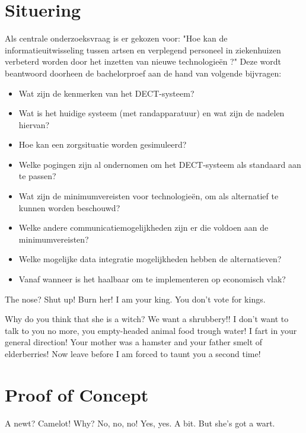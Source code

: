 \documentclass[a0,portrait]{hogent-poster}
\begin{document}
\begin{multicols}{2} %

\section{Situering}

Als centrale onderzoeksvraag is er gekozen voor: "Hoe kan de informatieuitwisseling tussen artsen en verplegend personeel in ziekenhuizen verbeterd worden door het inzetten van nieuwe technologieën ?" 
Deze wordt beantwoord doorheen de bachelorproef aan de hand van volgende bijvragen:

\begin{itemize}
  \item Wat zijn de kenmerken van het DECT-systeem?
  \item Wat is het huidige systeem (met randapparatuur) en wat zijn de nadelen hiervan?
  \item Hoe kan een zorgsituatie worden gesimuleerd?
  \item Welke pogingen zijn al ondernomen om het DECT-systeem als standaard aan te passen?
  \item Wat zijn de minimumvereisten voor technologieën, om als alternatief te kunnen worden beschouwd?
  \item Welke andere communicatiemogelijkheden zijn er die voldoen aan de minimumvereisten?
  \item Welke mogelijke data integratie mogelijkheden hebben de alternatieven?
  \item Vanaf wanneer is het haalbaar om te implementeren op economisch vlak?
\end{itemize}

The nose? Shut up! Burn her! I am your king. You don't vote for kings.

Why do you think that she is a witch? We want a shrubbery!! I don't want to talk to you no more, you empty-headed animal food trough water! I fart in your general direction! Your mother was a hamster and your father smelt of elderberries! Now leave before I am forced to taunt you a second time!

\section{Proof of Concept}

A newt? Camelot! Why? No, no, no! Yes, yes. A bit. But she's got a wart.


\end{multicols}
\end{document}
